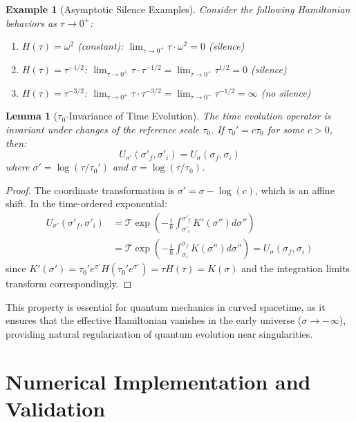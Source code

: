 \documentclass[11pt,a4paper]{article}
\newtheorem{lemma}[theorem]{Lemma}
\newtheorem{example}[theorem]{Example}
\begin{document}
\begin{example}[Asymptotic Silence Examples]
Consider the following Hamiltonian behaviors as $\tau \to 0^+$:

\begin{enumerate}
\item $H(\tau) = \omega^2$ (constant): $\lim_{\tau \to 0^+} \tau \cdot \omega^2 = 0$ (silence)
\item $H(\tau) = \tau^{-1/2}$: $\lim_{\tau \to 0^+} \tau \cdot \tau^{-1/2} = \lim_{\tau \to 0^+} \tau^{1/2} = 0$ (silence)  
\item $H(\tau) = \tau^{-3/2}$: $\lim_{\tau \to 0^+} \tau \cdot \tau^{-3/2} = \lim_{\tau \to 0^+} \tau^{-1/2} = \infty$ (no silence)
\end{enumerate}
\end{example}

\begin{lemma}[$\tau_0$-Invariance of Time Evolution]
The time evolution operator is invariant under changes of the reference scale $\tau_0$. If $\tau_0' = c \tau_0$ for some $c > 0$, then:
\begin{equation}
U_{\sigma'}(\sigma'_f, \sigma'_i) = U_{\sigma}(\sigma_f, \sigma_i)
\end{equation}
where $\sigma' = \log(\tau/\tau_0')$ and $\sigma = \log(\tau/\tau_0)$.
\end{lemma}

\begin{proof}
The coordinate transformation is $\sigma' = \sigma - \log(c)$, which is an affine shift. In the time-ordered exponential:
\begin{align}
U_{\sigma'}(\sigma'_f, \sigma'_i) &= \mathcal{T}\exp\left(-\frac{i}{\hbar}\int_{\sigma'_i}^{\sigma'_f} K'(\sigma'') d\sigma''\right) \\
&= \mathcal{T}\exp\left(-\frac{i}{\hbar}\int_{\sigma_i}^{\sigma_f} K(\sigma'') d\sigma''\right) = U_{\sigma}(\sigma_f, \sigma_i)
\end{align}
since $K'(\sigma') = \tau_0' e^{\sigma'} H(\tau_0' e^{\sigma'}) = \tau H(\tau) = K(\sigma)$ and the integration limits transform correspondingly.
\end{proof}

This property is essential for quantum mechanics in curved spacetime, as it ensures that the effective Hamiltonian vanishes in the early universe ($\sigma \to -\infty$), providing natural regularization of quantum evolution near singularities.

\section{Numerical Implementation and Validation}
\end{document}
